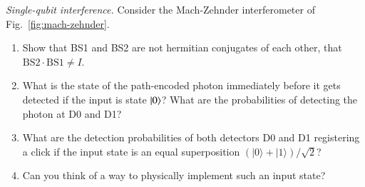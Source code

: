 \begin{exercise}
\emph{Single-qubit interference.}
Consider the Mach-Zehnder interferometer of Fig.~\ref{fig:mach-zehnder}.
\begin{enumerate}[label=(\alph*)]
    \item Show that BS1 and BS2 are not hermitian conjugates of each other, that $\text{BS}2\cdot\text{BS}1\neq I$.
    \item What is the state of the path-encoded photon immediately before it gets detected if the input is state $\left| 0 \right\rangle$? What are the probabilities of detecting the photon at D0 and D1?
    \item What are the detection probabilities of both detectors D0 and D1 registering a click if the input state is an equal superposition $(|0\rangle + |1\rangle)/\sqrt{2}$?
    \item Can you think of a way to physically implement such an input state?
\end{enumerate}
\end{exercise}
